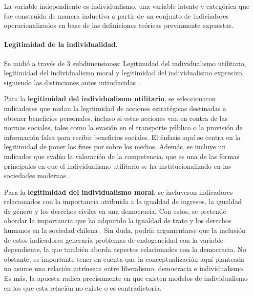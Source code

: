 \documentclass[12pt,twoside]{templates/facsothesis}
\begin{document}
La variable independiente es individualismo, una variable latente y categórica que fue construida de manera inductiva a partir de un conjunto de indiciadores operacionalizados en base de las definiciones teóricas previamente expuestas.

\hypertarget{legitimidad-de-la-individualidad.}{%
\paragraph*{Legitimidad de la individualidad.}\label{legitimidad-de-la-individualidad.}}

Se midió a través de 3 subdimensiones: Legitimidad del individualismo utilitario, legitimidad del individualismo moral y legitimidad del individualismo expresivo, siguiendo las distinciones antes introducidas \citep{cortois2018}.

Para la \textbf{legitimidad del individualismo utilitario}, se seleccionaron indicadores que midan la legitimidad de acciones estratégicas destinadas a obtener beneficios personales, incluso si estas acciones van en contra de las normas sociales, tales como la evasión en el transporte público o la provisión de información falsa para recibir beneficios sociales. El énfasis aquí se centra en la legitimidad de poner los fines por sobre los medios. Además, se incluye un indicador que evalúa la valoración de la competencia, que es una de las formas principales en que el individualismo utilitario se ha institucionalizado en las sociedades modernas \citep{cortois2018}.

Para la \textbf{legitimidad del individualismo moral}, se incluyeron indicadores relacionados con la importancia atribuida a la igualdad de ingresos, la igualdad de género y los derechos civiles en una democracia. Con estos, se pretende abordar la importancia que ha adquirido la igualdad de trato y los derechos humanos en la sociedad chilena \citep{araujo2012, araujo2020a}. Sin duda, podría argumentarse que la inclusión de estos indicadores generaría problemas de endogeneidad con la variable dependiente, la que también aborda aspectos relacionados con la democracia. No obstante, es importante tener en cuenta que la conceptualización aquí planteada no asume una relación intrínseca entre liberalismo, democracia e individualismo. Es más, la apuesta radica precisamente en que existen modelos de individualismo en los que esta relación no existe o es contradictoria.
\end{document}
